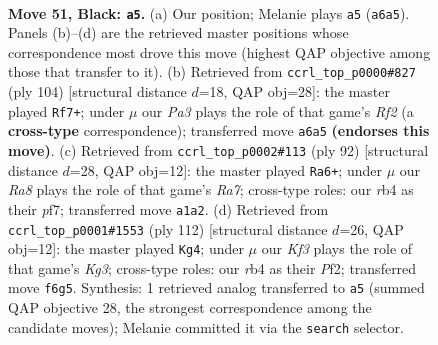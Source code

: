 \documentclass[11pt]{article}
\begin{document}
\clearpage

\begin{figure}[p]\centering
\begin{subfigure}{0.46\textwidth}\centering
\resizebox{\linewidth}{!}{%
\newchessgame
\chessboard[
  setfen={8/1R3p2/p3pk2/8/PR2P3/5P1P/4K3/r7 b - - 9 51},
  showmover=false,
  pgfstyle=straightmove, color=movearrow, markmove={a6-a5}
]}
\caption{}
\end{subfigure}\hfill
\begin{subfigure}{0.46\textwidth}\centering
\resizebox{\linewidth}{!}{%
\newchessgame
\chessboard[
  setfen={7R/2k5/p1r3rp/1p6/1P6/P1P5/1K3R2/8 w - - 1 53},
  showmover=false,
  pgfstyle=straightmove, color=movearrow, markmove={f2-f7}
]}
\caption{}
\end{subfigure}
\\[4pt]
\begin{subfigure}{0.46\textwidth}\centering
\resizebox{\linewidth}{!}{%
\newchessgame
\chessboard[
  setfen={8/R4p2/6k1/p4r1p/5P2/6PK/7P/8 w - - 2 47},
  showmover=false,
  pgfstyle=straightmove, color=movearrow, markmove={a7-a6}
]}
\caption{}
\end{subfigure}\hfill
\begin{subfigure}{0.46\textwidth}\centering
\resizebox{\linewidth}{!}{%
\newchessgame
\chessboard[
  setfen={8/1p1R4/p4k2/Pr4p1/8/4P1K1/5P2/8 w - - 2 57},
  showmover=false,
  pgfstyle=straightmove, color=movearrow, markmove={g3-g4}
]}
\caption{}
\end{subfigure}
\caption{\textbf{Move 51, Black: \texttt{a5}.} (a) Our position; Melanie plays \texttt{a5} (\texttt{a6a5}). Panels (b)--(d) are the retrieved master positions whose correspondence most drove this move (highest QAP objective among those that transfer to it). (b) Retrieved from \texttt{ccrl\_top\_p0000\#827} (ply 104) [structural distance $d$=18, QAP obj=28]: the master played \texttt{Rf7+}; under $\mu$ our \emph{Pa3} plays the role of that game's \emph{Rf2} (a \textbf{cross-type} correspondence); transferred move \texttt{a6a5} \textbf{(endorses this move)}. (c) Retrieved from \texttt{ccrl\_top\_p0002\#113} (ply 92) [structural distance $d$=28, QAP obj=12]: the master played \texttt{Ra6+}; under $\mu$ our \emph{Ra8} plays the role of that game's \emph{Ra7}; cross-type roles: our \emph{r}b4 as their \emph{p}f7; transferred move \texttt{a1a2}. (d) Retrieved from \texttt{ccrl\_top\_p0001\#1553} (ply 112) [structural distance $d$=26, QAP obj=12]: the master played \texttt{Kg4}; under $\mu$ our \emph{Kf3} plays the role of that game's \emph{Kg3}; cross-type roles: our \emph{r}b4 as their \emph{P}f2; transferred move \texttt{f6g5}. Synthesis: 1 retrieved analog transferred to \texttt{a5} (summed QAP objective 28, the strongest correspondence among the candidate moves); Melanie committed it via the \texttt{search} selector.}
\label{fig:thought-m101}
\end{figure}
\end{document}
